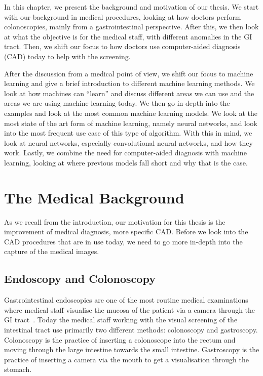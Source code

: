 In this chapter, we present the background and motivation of our thesis.
We start with our background in medical procedures, looking at how doctors perform colonoscopies, mainly from a gastrointestinal perspective.
After this, we then look at what the objective is for the medical staff, with different anomalies in the GI tract. Then, we shift our focus to how doctors use computer-aided diagnosis (CAD) today to help with the screening. 

After the discussion from a medical point of view, we shift our focus to machine learning and give a brief introduction to different machine learning methods. We look at how machines can ``learn'' and discuss different areas we can use and the areas we are using machine learning today. We then go in depth into the examples and look at the most common machine learning models. We look at the most state of the art form of machine learning, namely neural networks, and look into the most frequent use case of this type of algorithm.
With this in mind, we look at neural networks, especially convolutional neural networks, and how they work.
Lastly, we combine the need for computer-aided diagnosis with machine learning, looking at where previous models fall short and why that is the case.

\section{The Medical Background}
As we recall from the introduction, our motivation for this thesis is the improvement of medical diagnosis, more specific CAD. 
Before we look into the CAD procedures that are in use today, we need to go more in-depth into the capture of the medical images. 


\subsection{Endoscopy and Colonoscopy}
\label{cha:endocolo}
Gastrointestinal endoscopies are one of the most routine medical examinations where medical staff visualise the mucosa of the patient via a camera through the GI tract~\cite{Holme13}.
Today the medical staff working with the visual screening of the intestinal tract use primarily two different methods: colonoscopy and gastroscopy. 
Colonoscopy is the practice of inserting a colonoscope into the rectum and moving through the large intestine towards the small intestine.  Gastroscopy is the practice of inserting a camera via the mouth to get a visualisation through the stomach.

